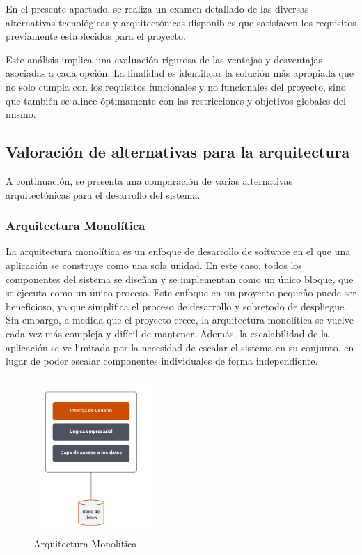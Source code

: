 
En el presente apartado, se realiza un examen detallado de las diversas alternativas tecnológicas y arquitectónicas disponibles que satisfacen los requisitos previamente establecidos para el proyecto. 

Este análisis implica una evaluación rigurosa de las ventajas y desventajas asociadas a cada opción. La finalidad es identificar la solución más apropiada que no solo cumpla con los requisitos funcionales y no funcionales del proyecto, sino que también se alinee óptimamente con las restricciones y objetivos globales del mismo.

\subsection{Valoración de alternativas para la arquitectura}
A continuación, se presenta una comparación de varias alternativas arquitectónicas para el desarrollo del sistema.
\subsubsection{Arquitectura Monolítica}
La arquitectura monolítica es un enfoque de desarrollo de software en el que una aplicación se construye como una sola unidad. En este caso, todos los componentes del sistema se diseñan y se implementan como un único bloque, que se ejecuta como un único proceso.
Este enfoque en un proyecto pequeño puede ser beneficioso, ya que simplifica el proceso de desarrollo y sobretodo de despliegue. Sin embargo, a medida que el proyecto crece, la arquitectura monolítica se vuelve cada vez más compleja y difícil de mantener. Además, la escalabilidad de la aplicación se ve limitada por la necesidad de escalar el sistema en su conjunto, en lugar de poder escalar componentes individuales de forma independiente.
\begin{figure}[H]
    \centering
    \includegraphics[width=0.4\textwidth]{figures/4-Estudio-viabilidad/4_Monolitica.png}
    \caption{Arquitectura Monolítica}
    \label{fig:arquitectura_monolitica}
    \hypertarget{fig:arquitectura_monolitica}{}
\end{figure}

